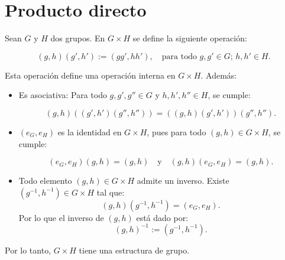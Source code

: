 

\section{Producto directo}

Sean \( G \) y \( H \) dos grupos. En \( G \times H \) se define la siguiente operación:


\[
(g,h)(g',h') := (gg', hh'), \quad \text{para todo } g, g' \in G; \, h, h' \in H.
\]


Esta operación define una operación interna en \( G \times H \). Además:

\begin{itemize}
	\item Es asociativa: Para todo \( g, g', g'' \in G \) y \( h, h', h'' \in H \), se cumple:
	
	
	\[
	(g,h)((g',h')(g'',h'')) = ((g,h)(g',h'))(g'',h'').
	\]
	
	
	
	\item \( (e_G, e_H) \) es la identidad en \( G \times H \), pues para todo \( (g,h) \in G \times H \), se cumple:
	
	
	\[
	(e_G, e_H) (g,h) = (g,h) \quad \text{y} \quad (g,h) (e_G, e_H) = (g,h).
	\]
	
	
	
	\item Todo elemento \( (g,h) \in G \times H \) admite un inverso. Existe \( (g^{-1}, h^{-1}) \in G \times H \) tal que:
	\[
	(g,h)(g^{-1}, h^{-1}) = (e_G, e_H).
	\]
	Por lo que el inverso de \( (g,h) \) está dado por:
	\[
	(g,h)^{-1} := (g^{-1}, h^{-1}).
	\]	
\end{itemize}
Por lo tanto, \( G \times H \) tiene una estructura de grupo.

\begin{definicion}
\end{definicion}


